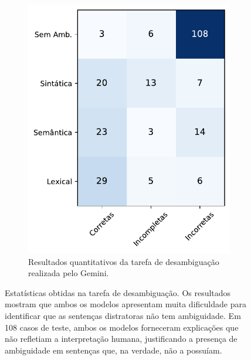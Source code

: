 \begin{figure}[htb]
\begin{subfigure}[b]{0.45\textwidth}
        \includegraphics[width=\textwidth]{matriz_confusao_desamb_Bard.pdf}
        \caption{Resultados quantitativos da tarefa de desambiguação realizada pelo Gemini.}
        \label{fig:matriz_confusao_bard}
    \end{subfigure}
    \caption{Estatísticas obtidas na tarefa de desambiguação. Os resultados mostram que ambos os modelos apresentam muita dificuldade para identificar que as sentenças distratoras não tem ambiguidade. Em 108 casos de teste, ambos os modelos forneceram explicações que não refletiam a interpretação humana, justificando a presença de ambiguidade em sentenças que, na verdade, não a possuíam.}
    \label{fig:matriz-confusao-desamb}
\end{figure}



